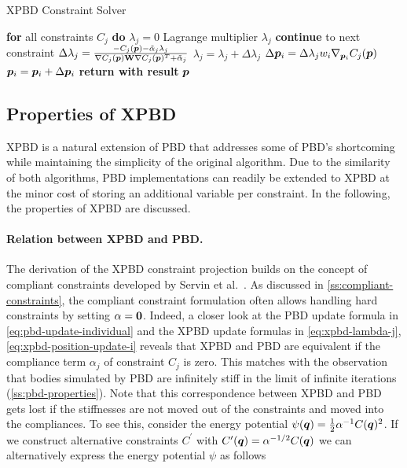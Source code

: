\begin{algorithm}
\caption{XPBD Constraint Solver}\label{alg:xpbd-solver}
\begin{algorithmic}[1]
\State \textbf{for} all constraints $C_j$ \textbf{do} $\lambda_j = 0$
\StatexIndent[3] Lagrange multiplier $\lambda_j$ \algorithmicdo
{}
\State \textbf{continue} to next constraint
\EndIf
\State $\Delta \lambda_j = \frac{-C_j(\bm{p}) - \tilde{\alpha}_j \lambda_{j}}{\nabla C_j(\bm{p}) \mathbf{W} \nabla C_j(\bm{p})^T + \tilde{\alpha}_j}$
\State $\lambda_{j} = \lambda_{j} + \Delta \lambda_j$
\State $\Delta \bm{p}_i = \Delta \lambda_j w_i \nabla_{\bm{p}_i} C_j(\bm{p})$
\State $\bm{p}_i = \bm{p}_i + \Delta \bm{p}_i$
\EndFor
\EndFor
\EndFor
\State \textbf{return with result } $\bm{p}$
\EndProcedure
\end{algorithmic}
\end{algorithm}

\subsection{Properties of XPBD}\label{ss:xpbd-properties}
XPBD is a natural extension of PBD that addresses some of PBD's shortcoming while maintaining the simplicity of the original algorithm. Due to
the similarity of both algorithms, PBD implementations can readily be extended to XPBD at the minor cost of storing an additional variable per 
constraint. In the following, the properties of XPBD are discussed.

\paragraph{Relation between XPBD and PBD.}
The derivation of the XPBD constraint projection builds on the concept of compliant constraints developed by Servin et al.\ 
\cite{servin2006}. As discussed in \cref{ss:compliant-constraints}, the compliant constraint formulation often allows handling hard constraints by
setting $\mathbf{\alpha} = \mathbf{0}$. Indeed, a closer look at the PBD update formula in \autoref{eq:pbd-update-individual} and the XPBD update 
formulas in \autoref{eq:xpbd-lambda-j}, \autoref{eq:xpbd-position-update-i} reveals that XPBD and 
PBD are equivalent if the compliance term $\alpha_j$ of constraint $C_j$ is zero. This matches with the observation that bodies 
simulated by PBD are infinitely stiff in the limit of infinite iterations (\cref{ss:pbd-properties}). Note that this correspondence between XPBD 
and PBD gets lost if the stiffnesses are not moved out of the constraints and moved into the compliances. To see this, consider the energy 
potential $\psi(\bm{q}) = \frac{1}{2} \alpha^{-1} C(\bm{q})^2$. If we construct alternative constraints $C^\prime$ with $C^\prime(\bm{q}) = 
\alpha^{-1/2}C(\bm{q})$ we can alternatively express the energy potential $\psi$ as follows

